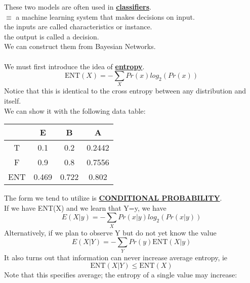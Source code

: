 \documentclass[../../lecture_notes.tex]{subfiles}
\begin{document}
\noindent These two models are often used in \textbf{\underline{classifiers}}.\\
\indent $\equiv$ a machine learning system that makes decisions on input.\\
	\indent \indent the inputs are called characteristics or instance.\\
	\indent \indent the output is called a decision.\\
We can construct them from Bayesian Networks.\\
\\
We must first introduce the idea of \textbf{\underline{entropy}}.
	\begin{equation*} \text{ENT}(X) = -\sum_X Pr(x) log_2{(Pr(x))} \end{equation*}
Notice that this is identical to the cross entropy between any distribution and itself.\\
We can show it with the following data table:

\begin{center}\begin{minipage}{0.4\textwidth}
\begin{center}\begin{tabular}{ | c | c c c | }\hline
	 & E & B & A\\\hline
	 T & 0.1 & 0.2 & 0.2442\\
	 F & 0.9 & 0.8 & 0.7556\\
	 ENT & 0.469 & 0.722 & 0.802\\\hline
\end{tabular}\end{center}\end{minipage}%
\begin{minipage}{0.6\textwidth}\end{minipage}\end{center}

\noindent The form we tend to utilize is \textbf{\underline{CONDITIONAL PROBABILITY}}.\\
If we have ENT(X) and we learn that Y=y, we have 
	\begin{equation*} E(X|y) = - \sum_X Pr(x|y) log_2{(Pr(x|y))} \end{equation*}
Alternatively, if we plan to observe Y but do not yet know the value
	\begin{equation*} E(X|Y) = - \sum_Y Pr(y) \text{ENT}(X|y) \end{equation*}
It also turns out that information can never increase average entropy, ie
	\begin{equation*} \text{ENT}(X|Y) \leq \text{ENT}(X) \end{equation*}
Note that this specifies average; the entropy of a single value may increase:
\end{document}
